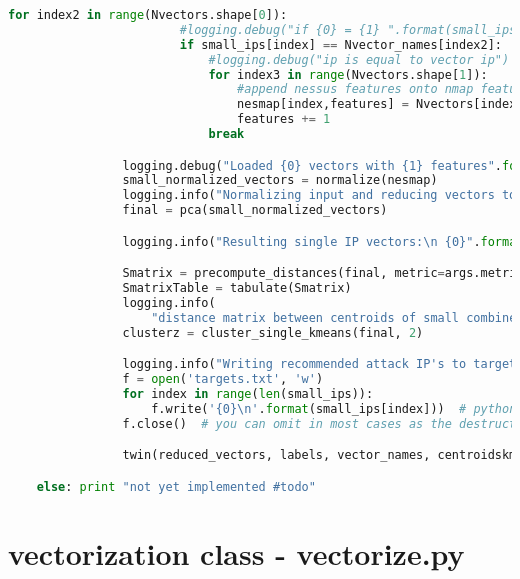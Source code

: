 \begin{lstlisting}[language=python]
                    for index2 in range(Nvectors.shape[0]):
                        #logging.debug("if {0} = {1} ".format(small_ips[index], Nvector_names[index2]))
                        if small_ips[index] == Nvector_names[index2]:
                            #logging.debug("ip is equal to vector ip")
                            for index3 in range(Nvectors.shape[1]):
                                #append nessus features onto nmap features
                                nesmap[index,features] = Nvectors[index2, index3]
                                features += 1
                            break

                logging.debug("Loaded {0} vectors with {1} features".format(nesmap.shape[0], nesmap.shape[1]))
                small_normalized_vectors = normalize(nesmap)
                logging.info("Normalizing input and reducing vectors to two dimensions with PCA")
                final = pca(small_normalized_vectors)

                logging.info("Resulting single IP vectors:\n {0}".format(final))

                Smatrix = precompute_distances(final, metric=args.metric)
                SmatrixTable = tabulate(Smatrix)
                logging.info(
                    "distance matrix between centroids of small combined clusters: {0} :\n{1}".format(args.metric, SmatrixTable))
                clusterz = cluster_single_kmeans(final, 2)

                logging.info("Writing recommended attack IP's to targets.txt for exploitation\n {0}")
                f = open('targets.txt', 'w')
                for index in range(len(small_ips)):
                    f.write('{0}\n'.format(small_ips[index]))  # python will convert \n to os.linesep
                f.close()  # you can omit in most cases as the destructor will call it

                twin(reduced_vectors, labels, vector_names, centroidskmeans, n_clusters, cluster_details, Nreduced_vectors, Nlabels, Nvector_names, Ncentroidskmeans, Nn_clusters, Ncluster_details, small_ips, final, clusterz, twinpath)

    else: print "not yet implemented #todo"
\end{lstlisting}


\section{vectorization class - vectorize.py}
\label{vectorize.py}
